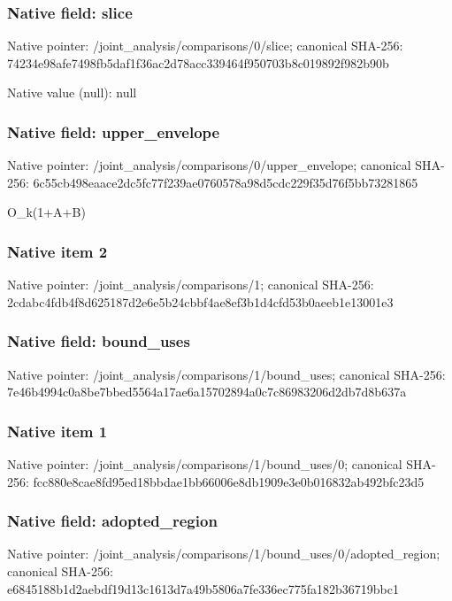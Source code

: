 \documentclass[10pt,a4paper]{article}
\begin{document}
\subsubsection{Native field: slice}
Native pointer: /joint\_\allowbreak{}analysis/comparisons/0/slice; canonical SHA-256: 74234e98afe7498fb5daf1f36ac2d78acc339464f950703b8c019892f982b90b

Native value (null): null

\subsubsection{Native field: upper\_\allowbreak{}envelope}
Native pointer: /joint\_\allowbreak{}analysis/comparisons/0/upper\_\allowbreak{}envelope; canonical SHA-256: 6c55cb498eaace2dc5fc77f239ae0760578a98d5cdc229f35d76f5bb73281865

\begingroup\raggedright\sloppy O\_\allowbreak{}k(1+A+B)\par\endgroup

\subsubsection{Native item 2}
Native pointer: /joint\_\allowbreak{}analysis/comparisons/1; canonical SHA-256: 2cdabc4fdb4f8d625187d2e6e5b24cbbf4ae8ef3b1d4cfd53b0aeeb1e13001e3

\subsubsection{Native field: bound\_\allowbreak{}uses}
Native pointer: /joint\_\allowbreak{}analysis/comparisons/1/bound\_\allowbreak{}uses; canonical SHA-256: 7e46b4994c0a8be7bbed5564a17ae6a15702894a0c7c86983206d2db7d8b637a

\subsubsection{Native item 1}
Native pointer: /joint\_\allowbreak{}analysis/comparisons/1/bound\_\allowbreak{}uses/0; canonical SHA-256: fcc880e8cae8fd95ed18bbdae1bb66006e8db1909e3e0b016832ab492bfc23d5

\subsubsection{Native field: adopted\_\allowbreak{}region}
Native pointer: /joint\_\allowbreak{}analysis/comparisons/1/bound\_\allowbreak{}uses/0/adopted\_\allowbreak{}region; canonical SHA-256: e6845188b1d2aebdf19d13c1613d7a49b5806a7fe336ec775fa182b36719bbc1
\end{document}
